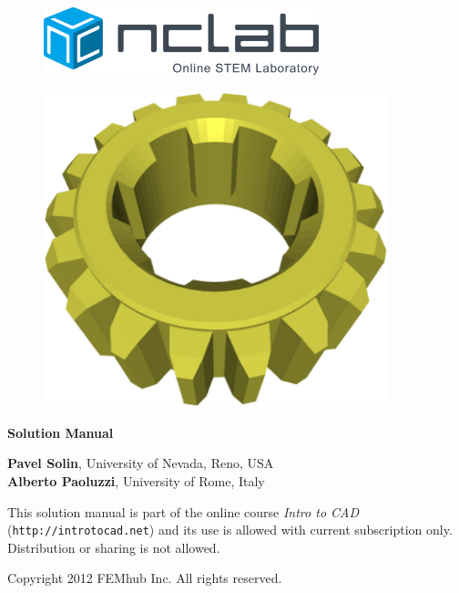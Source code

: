 \documentclass{article}
\begin{document}
\large

\vbox{}
\begin{figure}[!ht]
\includegraphics[width=8cm]{img/logo.png}
\vspace{18mm}
\end{figure}

\begin{figure}[!ht]
\begin{center}
\includegraphics[width=10cm]{img/plasm-frontpage.png}
\vspace{15mm}
\end{center}
\end{figure}

\begin{center}
{\Huge \bf Solution Manual}

\vfill


\vbox{}
\vfill
{\large
{\bf Pavel Solin}, University of Nevada, Reno, USA\\
{\bf Alberto Paoluzzi}, University of Rome, Italy
}
\end{center}
\newpage



\vbox{}
\vfill
\begin{center}
{\large
This solution manual is part of the online course 
{\em Intro to CAD} 
({\tt http://introtocad.net}) and its use is allowed 
with current subscription only. Distribution or sharing is not allowed. \\
}
\vfill

Copyright 2012 FEMhub Inc. All rights reserved.
\end{center}
\end{document}
